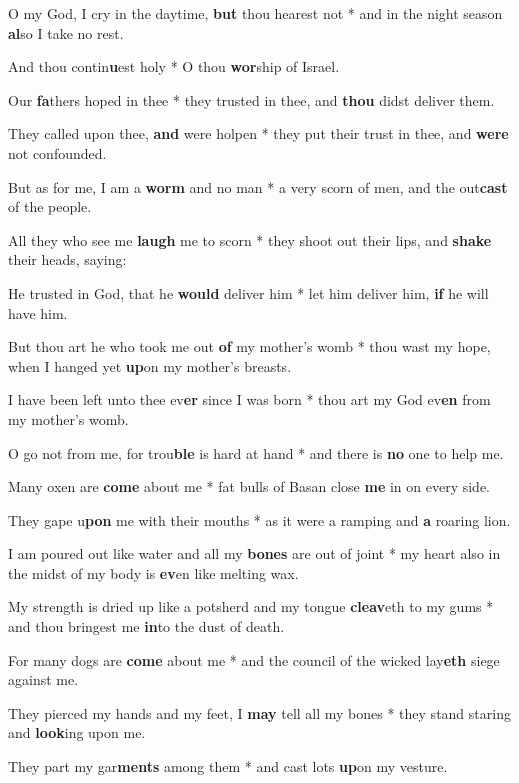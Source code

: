\begin{multicols}{2}
	O my God, I cry in the daytime, \textbf{but} thou hearest not * and in the night season \textbf{al}so I take no rest.
	
	And thou contin\textbf{u}est holy * O thou \textbf{wor}ship of Israel.
	
	Our \textbf{fa}thers hoped in thee * they trusted in thee, and \textbf{thou} didst deliver them.
	
	They called upon thee, \textbf{and} were holpen * they put their trust in thee, and \textbf{were} not confounded.
	
	But as for me, I am a \textbf{worm} and no man * a very scorn of men, and the out\textbf{cast} of the people.
	
	All they who see me \textbf{laugh} me to scorn * they shoot out their lips, and \textbf{shake} their heads, saying:
	
	He trusted in God, that he \textbf{would} deliver him * let him deliver him, \textbf{if} he will have him.
	
	But thou art he who took me out \textbf{of} my mother's womb * thou wast my hope, when I hanged yet \textbf{up}on my mother's breasts.
	
	I have been left unto thee ev\textbf{er} since I was born * thou art my God ev\textbf{en} from my mother's womb.
	
	O go not from me, for trou\textbf{ble} is hard at hand * and there is \textbf{no} one to help me.
	
	Many oxen are \textbf{come} about me * fat bulls of Basan close \textbf{me} in on every side.
	
	They gape u\textbf{pon} me with their mouths * as it were a ramping and \textbf{a} roaring lion.
	
	I am poured out like water and all my \textbf{bones} are out of joint * my heart also in the midst of my body is \textbf{ev}en like melting wax.
	
	My strength is dried up like a potsherd and my tongue \textbf{cleav}eth to my gums * and thou bringest me \textbf{in}to the dust of death.
	
	For many dogs are \textbf{come} about me * and the council of the wicked lay\textbf{eth} siege against me.
	
	They pierced my hands and my feet, I \textbf{may} tell all my bones * they stand staring and \textbf{look}ing upon me.
	
	They part my gar\textbf{ments} among them * and cast lots \textbf{up}on my vesture.
	

\end{multicols}
